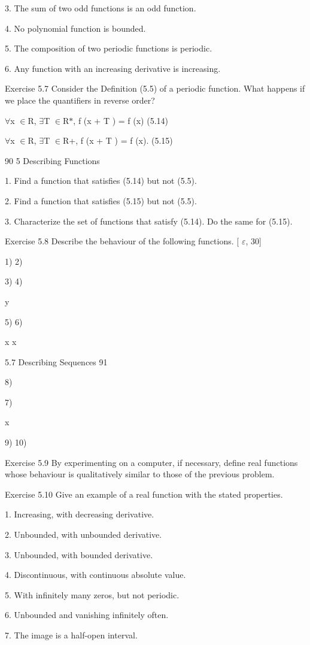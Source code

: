 \documentclass[11pt]{article}
\theoremstyle{plain}
\theoremstyle{definition}
\begin{document}
3. The sum of two odd functions is an odd function.

4. No polynomial function is bounded.

5. The composition of two periodic functions is periodic.

6. Any function with an increasing derivative is increasing.

Exercise 5.7 Consider the Definition (5.5) of a periodic function. What happens if we place the quantifiers in reverse order?

$\forall$x $\in$R, $\exists$T $\in$R$*$, f (x + T ) = f (x) (5.14)

$\forall$x $\in$R, $\exists$T $\in$R+, f (x + T ) = f (x). (5.15)

90 5 Describing Functions

1. Find a function that satisfies (5.14) but not (5.5).

2. Find a function that satisfies (5.15) but not (5.5).

3. Characterize the set of functions that satisfy (5.14). Do the same for (5.15).

Exercise 5.8 Describe the behaviour of the following functions. [ $\varepsilon$, 30]

1) 2)

3) 4)

y

5) 6)

x x

5.7 Describing Sequences 91

8)

7)

x

9) 10)

Exercise 5.9 By experimenting on a computer, if necessary, define real functions whose behaviour is qualitatively similar to those of the previous problem.

Exercise 5.10 Give an example of a real function with the stated properties.

1. Increasing, with decreasing derivative.

2. Unbounded, with unbounded derivative.

3. Unbounded, with bounded derivative.

4. Discontinuous, with continuous absolute value.

5. With infinitely many zeros, but not periodic.

6. Unbounded and vanishing infinitely often.

7. The image is a half-open interval.
\end{document}
